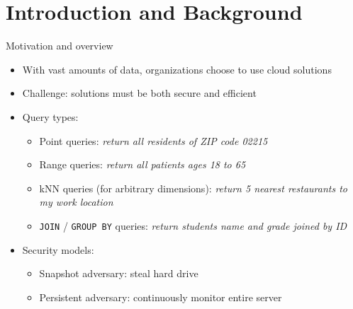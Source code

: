 \section{Introduction and Background}

	\begin{frame}{Motivation and overview}

		\begin{itemize}
			\item<1-> With vast amounts of data, organizations choose to use cloud solutions
			\item<1-> \alert{Challenge:} solutions must be both secure and efficient
			\item<2-> Query types:
				\begin{itemize}
					\item<1,2,6-> Point queries: \emph{return all residents of ZIP code 02215}
					\item<1,3,6-> Range queries: \emph{return all patients ages 18 to 65}
					\item<1,4,6-> kNN queries (for arbitrary dimensions): \emph{return 5 nearest restaurants to my work location}
					\item<1,5,6-> \texttt{JOIN} / \texttt{GROUP BY} queries: \emph{return students name and grade joined by ID}
				\end{itemize}
			\item<6-> Security models:
				\begin{itemize}
					\item<1-5,6> Snapshot adversary: steal hard drive %
					\item<1-5,7> Persistent adversary: continuously monitor entire server %
				\end{itemize}
		\end{itemize}

	\end{frame}

